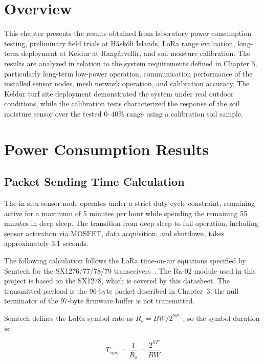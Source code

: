 \section{Overview}

This chapter presents the results obtained from laboratory power consumption testing, preliminary field trials at Háskóli Íslands, LoRa range evaluation, long-term deployment at Keldur at Rangárvellir, and soil moisture calibration. The results are analyzed in relation to the system requirements defined in Chapter 3, particularly long-term low-power operation, communication performance of the installed sensor nodes, mesh network operation, and calibration accuracy. The Keldur turf site deployment demonstrated the system under real outdoor conditions, while the calibration tests characterized the response of the soil moisture sensor over the tested 0--40\% range using a calibration soil sample.

\section{Power Consumption
Results}

\subsection{Packet Sending Time
Calculation}

The in situ sensor node operates under a strict duty cycle constraint,
remaining active for a maximum of 5 minutes per hour while spending the
remaining 55 minutes in deep sleep. The transition from deep sleep to
full operation, including sensor activation via MOSFET, data
acquisition, and shutdown, takes approximately 3.1 seconds.

The following calculation follows the LoRa time-on-air equations specified by Semtech for the SX1276/77/78/79 transceivers~\cite[Secs.~4.1.1.5--4.1.1.7, pp.~28--31]{semtech2020sx1276}. The Ra-02 module used in this project is based on the SX1278, which is covered by this datasheet. The transmitted payload is the 96-byte packet described in Chapter~3; the null terminator of the 97-byte firmware buffer is not transmitted.

Semtech defines the LoRa symbol rate as \(R_s = BW / 2^{SF}\)~\cite[Sec.~4.1.1.5, p.~28]{semtech2020sx1276}, so the symbol duration is:

\begin{equation}
T_{sym} = \frac{1}{R_s} = \frac{2^{SF}}{BW}
\label{eq:symbol-time}
\end{equation}

